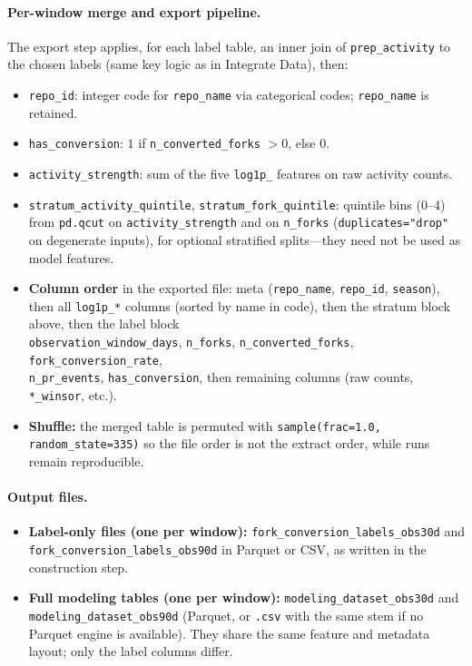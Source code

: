 \paragraph{Per-window merge and export pipeline.}
The export step applies, for each label table, an inner join of \texttt{prep\_activity} to the chosen labels (same key logic as in Integrate Data), then:
\begin{itemize}
  \item \texttt{repo\_id}: integer code for \texttt{repo\_name} via categorical codes; \texttt{repo\_name} is retained.
  \item \texttt{has\_conversion}: $1$ if \texttt{n\_converted\_forks} $>0$, else $0$.
  \item \texttt{activity\_strength}: sum of the five \texttt{log1p\_} features on raw activity counts.
  \item \texttt{stratum\_activity\_quintile}, \texttt{stratum\_fork\_quintile}: quintile bins (0--4) from \texttt{pd.qcut} on \texttt{activity\_strength} and on \texttt{n\_forks} (\texttt{duplicates="drop"} on degenerate inputs), for optional stratified splits---they need not be used as model features.
  \item \textbf{Column order} in the exported file: meta (\texttt{repo\_name}, \texttt{repo\_id}, \texttt{season}), then all \texttt{log1p\_*} columns (sorted by name in code), then the stratum block above, then the label block\\ \texttt{observation\_window\_days}, \texttt{n\_forks}, \texttt{n\_converted\_forks}, \texttt{fork\_conversion\_rate},\\ \texttt{n\_pr\_events}, \texttt{has\_conversion}, then remaining columns (raw counts, \texttt{*\_winsor}, etc.).
  \item \textbf{Shuffle:} the merged table is permuted with \texttt{sample(frac=1.0, random\_state=335)} so the file order is not the extract order, while runs remain reproducible.
\end{itemize}

\paragraph{Output files.}
\begin{itemize}
  \item \textbf{Label-only files (one per window):} \texttt{fork\_conversion\_labels\_obs30d} and\\ \texttt{fork\_conversion\_labels\_obs90d} in Parquet or CSV, as written in the construction step.
  \item \textbf{Full modeling tables (one per window):} \texttt{modeling\_dataset\_obs30d} and\\ \texttt{modeling\_dataset\_obs90d} (Parquet, or \texttt{.csv} with the same stem if no Parquet engine is available). They share the same feature and metadata layout; only the label columns differ. 
\end{itemize}
